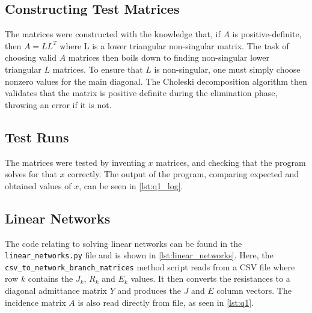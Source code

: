 \documentclass[a4paper,titlepage]{article}
\begin{document}
	
	\subsection{Constructing Test Matrices}
	
	The matrices were constructed with the knowledge that, if $A$ is positive-definite, then $A = LL^T$ where L is a lower triangular non-singular matrix. The task of choosing valid $A$ matrices then boils down to finding non-singular lower triangular $L$ matrices. To ensure that $L$ is non-singular, one must simply choose nonzero values for the main diagonal. The Choleski decomposition algorithm then validates that the matrix is positive definite during the elimination phase, throwing an error if it is not.
	
	\subsection{Test Runs}
	
	The matrices were tested by inventing $x$ matrices, and checking that the program solves for that $x$ correctly. The output of the program, comparing expected and obtained values of $x$, can be seen in \autoref{lst:q1_log}.
	
	\subsection{Linear Networks}
	
	The code relating to solving linear networks can be found in the \texttt{linear_networks.py} file and is shown in \autoref{lst:linear_networks}. Here, the \texttt{csv_to_network_branch_matrices} method script reads from a CSV file where row $k$ contains the $J_k$, $R_k$ and $E_k$ values. It then converts the resistances to a diagonal admittance matrix $Y$ and produces the $J$ and $E$ column vectors. The incidence matrix $A$ is also read directly from file, as seen in \autoref{lst:q1}.
	
\end{document}
